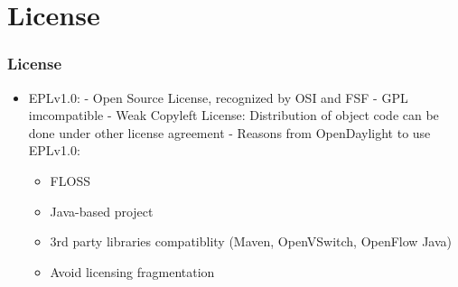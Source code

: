 \section{License}

\begin{frame}
\frametitle{License}

\begin{itemize}
 \item EPLv1.0:\linebreak
 - Open Source License, recognized by OSI and FSF\linebreak
 - GPL imcompatible\linebreak
 - Weak Copyleft License: Distribution of object code can be done under other license agreement\linebreak
 - Reasons from OpenDaylight to use EPLv1.0:
 \begin{itemize}
   \item FLOSS
   \item Java-based project
   \item 3rd party libraries compatiblity (Maven, OpenVSwitch, OpenFlow Java)
   \item Avoid licensing fragmentation
 \end{itemize}
\end{itemize}

\end{frame}
